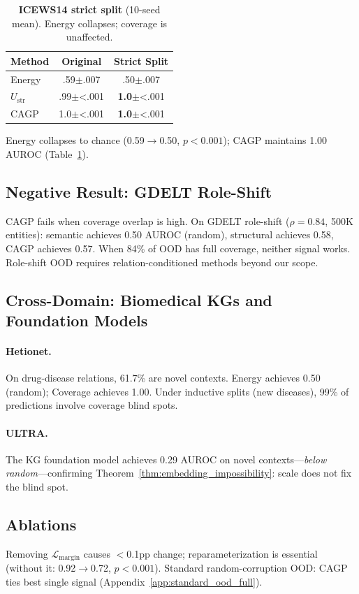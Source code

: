 \begin{table}[t]
\centering
\caption{\textbf{ICEWS14 strict split} (10-seed mean). Energy collapses; coverage is unaffected.\label{tab:strict_split}}
\small
\begin{tabular}{lcc}
\toprule
Method & Original & Strict Split \\
\midrule
Energy & .59$\pm$.007 & .50$\pm$.007 \\
$U_{\text{str}}$ & .99$\pm${\textless}.001 & \textbf{1.0}$\pm${\textless}.001 \\
CAGP & 1.0$\pm${\textless}.001 & \textbf{1.0}$\pm${\textless}.001 \\
\bottomrule
\end{tabular}
\end{table}

Energy collapses to chance (0.59$\to$0.50, $p < 0.001$); CAGP maintains 1.00 AUROC (Table~\ref{tab:strict_split}).

\subsection{Negative Result: GDELT Role-Shift}
\label{sec:gdelt}

CAGP fails when coverage overlap is high. On GDELT role-shift ($\rho = 0.84$, 500K entities): semantic achieves 0.50 AUROC (random), structural achieves 0.58, CAGP achieves 0.57. When 84\% of OOD has full coverage, neither signal works. Role-shift OOD requires relation-conditioned methods beyond our scope.

\subsection{Cross-Domain: Biomedical KGs and Foundation Models}

\paragraph{Hetionet.} On drug-disease relations, 61.7\% are novel contexts. Energy achieves 0.50 (random); Coverage achieves 1.00. Under inductive splits (new diseases), 99\% of predictions involve coverage blind spots.

\paragraph{ULTRA.} The KG foundation model achieves 0.29 AUROC on novel contexts---\emph{below random}---confirming Theorem~\ref{thm:embedding_impossibility}: scale does not fix the blind spot.

\subsection{Ablations}

Removing $\mathcal{L}_{\text{margin}}$ causes $<$0.1pp change; reparameterization is essential (without it: 0.92$\to$0.72, $p < 0.001$). Standard random-corruption OOD: CAGP ties best single signal (Appendix~\ref{app:standard_ood_full}).
